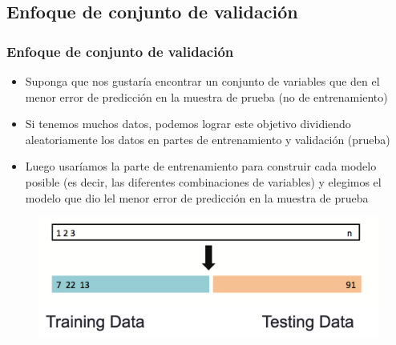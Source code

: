 \documentclass[
  shownotes,
  xcolor={svgnames},
  hyperref={colorlinks,citecolor=DarkBlue,linkcolor=DarkRed,urlcolor=DarkBlue}
  , aspectratio=169]{beamer}
\begin{document}
\subsection{Enfoque de conjunto de validación}
\begin{frame}[fragile]
\frametitle{Enfoque de conjunto de validación}

\begin{itemize}
\item Suponga que nos gustaría encontrar un conjunto de variables que den el menor  error de predicción en la muestra de prueba (no de entrenamiento) 
\item Si tenemos muchos datos, podemos lograr este objetivo dividiendo aleatoriamente los datos en partes de entrenamiento y validación (prueba)
\item Luego usaríamos la parte de entrenamiento para construir cada modelo posible (es decir, las diferentes combinaciones de variables) y elegimos el modelo que dio lel menor  error de predicción en la muestra de prueba
\end{itemize}

       \begin{figure}[H] \centering
            \captionsetup{justification=centering}
              \includegraphics[scale=0.4]{figures/fig51.png}
       \end{figure}

\end{frame}
\end{document}

